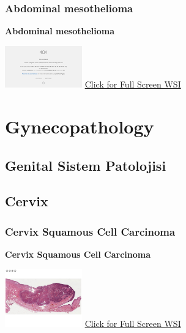 \documentclass[
  letterpaper,
  paper=6in:9in,
  pagesize=pdftex,
  headinclude=on,
  footinclude=on,
  12pt]{scrbook}
\begin{document}
\hypertarget{sec-abdominal-mesothelioma}{%
\section{Abdominal mesothelioma}\label{sec-abdominal-mesothelioma}}

\textbf{Abdominal mesothelioma}

\href{https://images.patolojiatlasi.com/abdominal-mezotelyoma/HE.html}{\includegraphics[width=0.25\textwidth,height=\textheight]{./screenshots/abdominal-mezotelyoma_screenshot.png}}
\href{https://images.patolojiatlasi.com/abdominal-mesothelioma/HE.html}{Click
for Full Screen WSI}

\part{Gynecopathology}

\hypertarget{section-2}{%
\chapter{}\label{section-2}}

\hypertarget{sec-genital-sistem-patolojisi}{%
\chapter{Genital Sistem
Patolojisi}\label{sec-genital-sistem-patolojisi}}

\hypertarget{sec-cervix}{%
\chapter{Cervix}\label{sec-cervix}}

\hypertarget{sec-cervix-squamous-cell-carcinoma}{%
\section{Cervix Squamous Cell
Carcinoma}\label{sec-cervix-squamous-cell-carcinoma}}

\textbf{Cervix Squamous Cell Carcinoma}

\href{https://images.patolojiatlasi.com/cervix-SCC/HE.html}{\includegraphics[width=0.25\textwidth,height=\textheight]{./screenshots/cervix-SCC_screenshot.png}}
\href{https://images.patolojiatlasi.com/cervix-SCC/HE.html}{Click for
Full Screen WSI}
\end{document}
